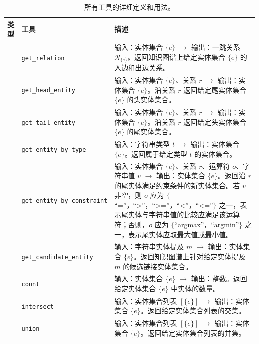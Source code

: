 \documentclass[11pt,UTF8,fontset=fandol]{ctexart}
\begin{document}
\begin{table}[H]\centering
\caption{所有工具的详细定义和用法。}
\label{tab:8}
\setlength{\tabcolsep}{4pt}
\renewcommand{\arraystretch}{1.3}
\begin{tabular}{p{1.6cm} p{3.6cm} p{9.5cm}}
\toprule
\textbf{类型} & \textbf{工具} & \textbf{描述} \\
\midrule
{}
& \texttt{get\_relation}
& 输入：实体集合 $\{e\}$ $\rightarrow$ 输出：一跳关系 $\mathcal{R}_{\{e\}}$。返回知识图谱上给定实体集合 $\{e\}$ 的入边和出边关系。 \\
\cmidrule(l){2-3}
& \texttt{get\_head\_entity}
& 输入：实体集合 $\{e\}$、关系 $r$ $\rightarrow$ 输出：实体集合 $\{e\}$。沿关系 $r$ 返回给定尾实体集合 $\{e\}$ 的头实体集合。 \\
\cmidrule(l){2-3}
& \texttt{get\_tail\_entity}
& 输入：实体集合 $\{e\}$、关系 $r$ $\rightarrow$ 输出：实体集合 $\{e\}$。沿关系 $r$ 返回给定头实体集合 $\{e\}$ 的尾实体集合。 \\
\cmidrule(l){2-3}
& \texttt{get\_entity\_by\_type}
& 输入：字符串类型 $t$ $\rightarrow$ 输出：实体集合 $\{e\}$。返回属于给定类型 $t$ 的实体集合。 \\
\cmidrule(l){2-3}
& \texttt{get\_entity\_by\_constraint}
& 输入：实体集合 $\{e\}$、关系 $r$、运算符 $o$、字符串值 $v$ $\rightarrow$ 输出：实体集合 $\{e\}$。返回沿 $r$ 的尾实体满足约束条件的新实体集合。若 $v$ 非空，则 $o$ 应为 $\{$``=''，``>''，``>=''，``<''，``<=''$\}$ 之一，表示尾实体与字符串值的比较应满足该运算符；否则，$o$ 应为 $\{$``argmax''，``argmin''$\}$ 之一，表示尾实体应取最大值或最小值。 \\
\cmidrule(l){2-3}
& \texttt{get\_candidate\_entity}
& 输入：字符串实体提及 $m$ $\rightarrow$ 输出：实体集合 $\{e\}$。返回知识图谱上针对给定实体提及 $m$ 的候选链接实体集合。 \\
\midrule
{}
& \texttt{count}
& 输入：实体集合 $\{e\}$ $\rightarrow$ 输出：整数。返回给定实体集合 $\{e\}$ 中实体的数量。 \\
\cmidrule(l){2-3}
& \texttt{intersect}
& 输入：实体集合列表 $[\{e\}]$ $\rightarrow$ 输出：实体集合 $\{e\}$。返回给定实体集合列表的交集。 \\
\cmidrule(l){2-3}
& \texttt{union}
& 输入：实体集合列表 $[\{e\}]$ $\rightarrow$ 输出：实体集合 $\{e\}$。返回给定实体集合列表的并集。 \\

\end{tabular}
\end{table}
\end{document}
